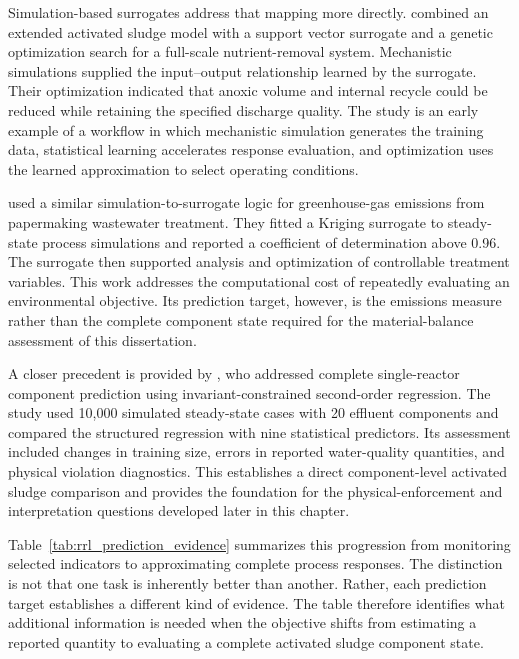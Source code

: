 Simulation-based surrogates address that mapping more directly. \citet{Fang2011} combined an extended activated sludge model with a support vector surrogate and a genetic optimization search for a full-scale nutrient-removal system. Mechanistic simulations supplied the input--output relationship learned by the surrogate. Their optimization indicated that anoxic volume and internal recycle could be reduced while retaining the specified discharge quality. The study is an early example of a workflow in which mechanistic simulation generates the training data, statistical learning accelerates response evaluation, and optimization uses the learned approximation to select operating conditions.

\citet{He2023} used a similar simulation-to-surrogate logic for greenhouse-gas emissions from papermaking wastewater treatment. They fitted a Kriging surrogate to steady-state process simulations and reported a coefficient of determination above 0.96. The surrogate then supported analysis and optimization of controllable treatment variables. This work addresses the computational cost of repeatedly evaluating an environmental objective. Its prediction target, however, is the emissions measure rather than the complete component state required for the material-balance assessment of this dissertation.

A closer precedent is provided by \citet{Selerio2026}, who addressed complete single-reactor component prediction using invariant-constrained second-order regression. The study used 10,000 simulated steady-state cases with 20 effluent components and compared the structured regression with nine statistical predictors. Its assessment included changes in training size, errors in reported water-quality quantities, and physical violation diagnostics. This establishes a direct component-level activated sludge comparison and provides the foundation for the physical-enforcement and interpretation questions developed later in this chapter.

Table~\ref{tab:rrl_prediction_evidence} summarizes this progression from monitoring selected indicators to approximating complete process responses. The distinction is not that one task is inherently better than another. Rather, each prediction target establishes a different kind of evidence. The table therefore identifies what additional information is needed when the objective shifts from estimating a reported quantity to evaluating a complete activated sludge component state.

